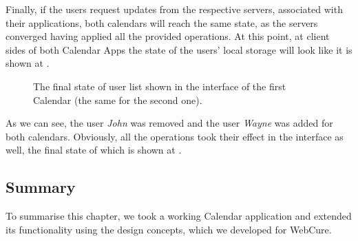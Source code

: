Finally, if the users request updates from the respective servers, associated with their applications, both calendars will reach the same state, as the servers converged having applied all the provided operations. At this point, at client sides of both Calendar Apps the state of the users' local storage will look like it is shown at .

\begin{figure}[!htb]
    \begin{center}
    \setlength{\fboxsep}{4pt}%
    \setlength{\fboxrule}{1pt}%
    {\scriptsize%
     }
    \caption {The final state of user list shown in the interface of the first Calendar (the same for the second one).}
    \label{fig:ev-fig-3}
\end{center}
\end{figure}

As we can see, the user \textit{John} was removed and the user \textit{Wayne} was added for both calendars. Obviously, all the operations took their effect in the interface as well, the final state of which is shown at .

\subsection*{Summary}

To summarise this chapter, we took a working Calendar application and extended its functionality using the design concepts, which we developed for WebCure. 

